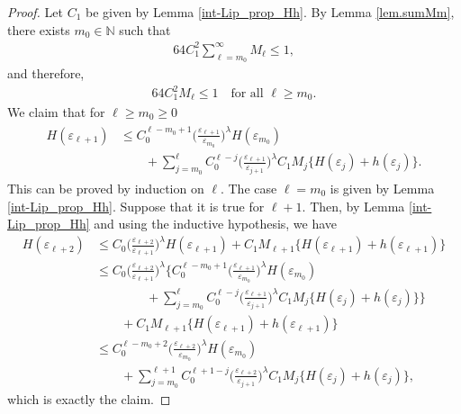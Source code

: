 \documentclass[reqno,12pt]{amsart} %
\theoremstyle{definition}
\theoremstyle{remark}
\numberwithin{equation}{section}
\newcommand{\N}{\mathbb{N}}
\begin{document}
\begin{proof}
Let $C_1$ be given by Lemma \ref{int-Lip_prop_Hh}. By Lemma \ref{lem.sumMm}, there exists $m_0 \in \N$ such that
\begin{align}\label{int-Lip_es_M_remainder}
    64C_1^2\sum_{\ell=m_0}^\infty M_\ell\leq 1,
\end{align}
and therefore,
\begin{align}\label{int-Lip_property_Mj}
    64C_1^2 M_\ell\leq 1\quad \text{for all }\ell \geq m_0.
\end{align}
We claim that for $\ell\geq m_0 \geq 0$
  \begin{align}\label{int-Lip_H_claim}
    \begin{split}
      H(\varepsilon_{\ell+1}) & \leq C_0^{\ell-m_0+1}\Big(\frac{\varepsilon_{\ell+1}}{\varepsilon_{m_0}}\Big)^\lambda H(\varepsilon_{m_0})\\
      & \qquad+\sum_{j=m_0}^{\ell}C_0^{\ell-j}\Big(\frac{\varepsilon_{\ell+1}}{\varepsilon_{j+1}}\Big)^\lambda C_1M_j\{H(\varepsilon_j)+h(\varepsilon_j)\}.
    \end{split}
  \end{align}
  This can be proved by induction on $\ell$. The case $\ell=m_0$ is given by Lemma \ref{int-Lip_prop_Hh}. Suppose that it is true for $\ell+1$. Then, by Lemma \ref{int-Lip_prop_Hh} and using the inductive hypothesis, we have
  \begin{align*}
    H(\varepsilon_{\ell+2})&\leq C_0\Big(\frac{\varepsilon_{\ell+2}}{\varepsilon_{\ell+1}}\Big)^\lambda H(\varepsilon_{\ell+1})+C_1M_{\ell+1}\{H(\varepsilon_{\ell+1})+h(\varepsilon_{\ell+1})\}\\
    &\leq C_0\Big(\frac{\varepsilon_{\ell+2}}{\varepsilon_{\ell+1}}\Big)^\lambda \bigg\{C_0^{\ell-m_0+1}\Big(\frac{\varepsilon_{\ell+1}}{\varepsilon_{m_0}}\Big)^\lambda H(\varepsilon_{m_0})\\
    &\qquad \qquad+\sum_{j=m_0}^\ell C_0^{\ell-j}\Big(\frac{\varepsilon_{\ell+1}}{\varepsilon_{j+1}}\Big)^\lambda C_1M_j\big\{H(\varepsilon_j)+h(\varepsilon_j)\big\}\bigg\}\\
    &\qquad +C_1M_{\ell+1}\{H(\varepsilon_{\ell+1})+h(\varepsilon_{\ell+1})\}\\&\leq C_0^{\ell-m_0+2}\Big(\frac{\varepsilon_{\ell+2}}{\varepsilon_{m_0}}\Big)^\lambda H(\varepsilon_{m_0})\\&\qquad+\sum_{j=m_0}^{\ell+1} C_0^{\ell+1-j}\Big(\frac{\varepsilon_{\ell+2}}{\varepsilon_{j+1}}\Big)^\lambda C_1M_j\{H(\varepsilon_j)+h(\varepsilon_j)\},
  \end{align*}
  which is exactly the claim.


\end{proof}
\end{document}
